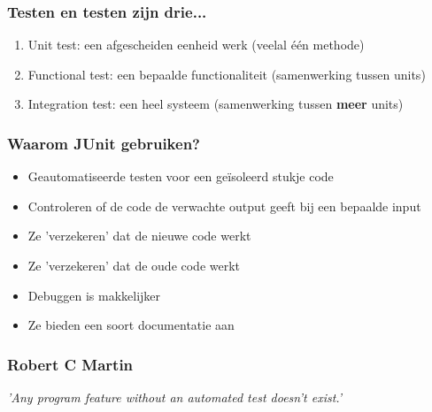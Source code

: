 \documentclass{beamer}
\begin{document}
\begin{frame}

\frametitle{Testen en testen zijn drie...}

\begin{enumerate}

\item {\Large Unit test: een afgescheiden eenheid werk (veelal \'e\'en methode) }
\item {\Large Functional test: een bepaalde functionaliteit (samenwerking tussen units)}
\item {\Large Integration test: een heel systeem (samenwerking tussen \textbf{meer} units)}
  
\end{enumerate}

\end{frame}


\begin{frame}

\frametitle{Waarom JUnit gebruiken?}

\begin{itemize}

\item {\LARGE Geautomatiseerde testen voor een ge\"isoleerd stukje code}
\item {\LARGE Controleren of de code de verwachte output geeft bij een bepaalde input}
\item {\LARGE Ze 'verzekeren' dat de nieuwe code werkt}
\item {\LARGE Ze 'verzekeren' dat de oude code werkt}
\item {\LARGE Debuggen is makkelijker}
\item {\LARGE Ze bieden een soort documentatie aan}

\end{itemize}

\end{frame}


\begin{frame}

\frametitle{Robert C Martin}

\begin{center}
{\huge \textit{'Any program feature without an automated test doesn't exist.'}}
\end{center}

% 
% 
% 

\end{frame}
\end{document}
